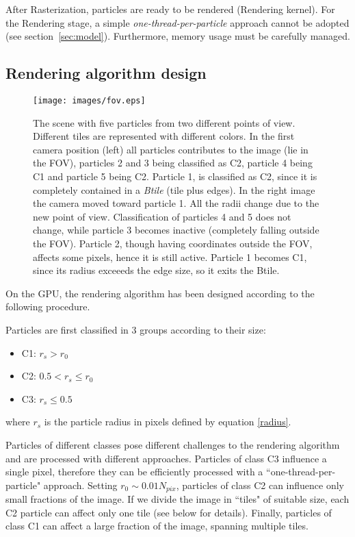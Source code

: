 \documentclass[11pt]{article}
\begin{document}
After Rasterization, particles are ready to be rendered (Rendering kernel).
For the Rendering stage, a simple {\it one-thread-per-particle} approach
cannot be adopted (see section~\ref{sec:model}). Furthermore, memory usage must be carefully managed.

\subsection{Rendering algorithm design}
\label{sec:design}

\begin{figure}
\centering
\texttt{[image: images/fov.eps]}
\caption{The scene with five particles from two different points of view. Different tiles are 
represented with different colors. In the first camera position
(left) all particles contributes to the image (lie in the FOV), particles 2 and 3
being classified as C2, particle 4 being C1 and particle 5 being C2. Particle 1, is classified
as C2, since it is completely contained in a {\it Btile} (tile plus edges). In the right
image the camera moved toward particle 1. All the radii change due to the new point
of view. Classification of particles 4 and 5 does not change, while particle 3 
becomes inactive (completely falling outside the FOV). Particle 2, though 
having coordinates outside the FOV, affects some pixels, hence it is still active.
Particle 1 becomes C1, since its radius exceeeds the edge size, so it exits the Btile. 
}
\label{fig:fov}
\end{figure}


On the GPU, the rendering algorithm has been designed according to the following procedure.

Particles are first classified in 3 groups according to their size:
\begin{itemize}
\item 
C1: $r_s > r_0$
\item
C2: $0.5 < r_s \le r_0$
\item
C3: $r_s \le 0.5$
\end{itemize}
where $r_s$ is the particle radius in pixels defined by equation \eqref{radius}.

Particles of different classes pose different challenges to the rendering 
algorithm and are processed with different approaches. Particles of class C3 
influence a single pixel, therefore they can be efficiently 
processed with a ``one-thread-per-particle" approach. Setting $r_0 \sim 0.01 N_{pix}$, 
particles of class C2 can influence only small fractions of the image. If 
we divide the image in ``tiles" of suitable size, each C2 particle can affect 
only one tile (see below for details). Finally, particles of class C1 can affect 
a large fraction of the image, spanning multiple tiles.
\end{document}
